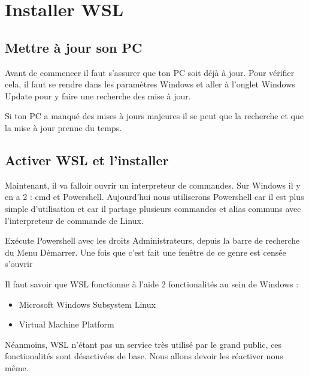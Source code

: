 \documentclass[a4paper, 12pt]{article}
\begin{document}
\section{Installer WSL}

{\comfortaa

    \subsection{Mettre à jour son PC}

    Avant de commencer il faut s'assurer que ton PC soit déjà à jour.
    Pour vérifier cela, il faut se rendre dans les paramètres Windows et aller
    à l'onglet Windows Update pour y faire une recherche des mise à jour.
    \newline \newline


    Si ton PC a manqué des mises à jours majeures il se peut que la recherche et que la
    mise à jour prenne du temps.
    \newline \newline

    
    \subsection{Activer WSL et l'installer}

    Maintenant, il va falloir ouvrir un interpreteur de commandes. Sur Windows il y en a 2 : cmd et Powershell.
    Aujourd'hui nous utiliserons Powershell car il est plus simple d'utilisation et car il partage plusieurs commandes et alias
    communs avec l'interpreteur de commande de Linux.
    \newline

    \vspace{1cm}
    Exécute Powershell avec les droits Administrateurs, depuis la barre de recherche du Menu Démarrer.
    \newline
    Une fois que c'est fait une fenêtre de ce genre est censée s'ouvrir

    Il faut savoir que WSL fonctionne à l'aide 2 fonctionalités au sein de Windows :
    \begin{itemize}
    \item Microsoft Windows Subsystem Linux
    \item Virtual Machine Platform
    \end{itemize}
    \vspace{1cm}
    Néanmoins, WSL n'étant pas un service
    très utilisé par le grand public, ces fonctionalités sont désactivées de base.
    \newline
    Nous allons devoir les réactiver nous même.
    
}
\end{document}
